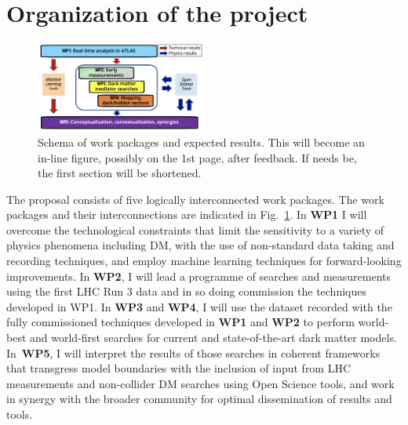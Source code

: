 \documentclass[11pt,a4paper]{article}
\begin{document}
\section{Organization of the project} 

\smallskip



\begin{figure}[h!]
\begin{center}
\includegraphics[width=0.5\textwidth]{figs/WPs_shorter}
\caption{\label{fig:WPs} \footnotesize Schema of work packages and expected results.\color{red} This will become an in-line figure, possibly on the 1st page, after feedback. If needs be, the first section will be shortened. \color{black}}
\end{center}
\end{figure}

The proposal consists of five logically interconnected work packages.
The work packages and their interconnections are indicated in Fig.~\ref{fig:WPs}. In \textbf{WP1} I will overcome the technological constraints that limit the sensitivity to a variety of physics phenomena including DM, with the use of non-standard data taking and recording techniques, and employ machine learning techniques for forward-looking improvements. In \textbf{WP2}, I will lead a programme of searches and measurements using the first LHC Run 3 data and in so doing commission the techniques developed in WP1. In \textbf{WP3} and \textbf{WP4}, I will use the dataset recorded with the fully commissioned techniques developed in \textbf{WP1} and \textbf{WP2} to perform world-best and world-first searches for current and state-of-the-art dark matter models. In~\textbf{WP5}, I will interpret the results of those searches in coherent frameworks that transgress model boundaries with the inclusion of input from LHC measurements and non-collider DM searches using Open Science tools, and work in synergy with the broader community for optimal dissemination of results and tools. 
\end{document}
